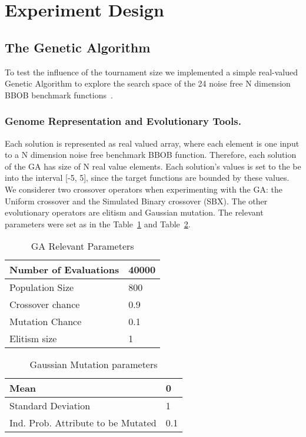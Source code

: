 \section{Experiment Design}

\subsection{The Genetic Algorithm}\label{sec:proposed:ga}

To test the influence of the tournament size we implemented a simple real-valued Genetic Algorithm to explore the search space of the 24 noise free N dimension BBOB benchmark functions~\cite{hansen2010real}.

\subsubsection*{Genome Representation and Evolutionary Tools.}
Each solution is represented as real valued array, where each element is one input to a N dimension noise free benchmark BBOB function. Therefore, each solution of the GA has size of N real value elements. Each solution's values is set to the be into the interval [-5, 5], since the target functions are bounded by these values. We considerer two crossover operators when experimenting with the GA: the Uniform crossover and the Simulated Binary crossover (SBX). The other evolutionary operators are elitism and Gaussian mutation. The relevant parameters were set as in the Table~\ref{relevant_par} and Table~\ref{gaussian_par}.

\vspace{3mm}
\begin{table}[!ht]
	\centering
	\begin{tabular}{|l|l|}
	\hline
	Number of Evaluations & 40000 \\ \hline
	Population Size &  800		\\ \hline
	Crossover chance 	& 0.9	\\ \hline
	Mutation Chance 	& 0.1	\\ \hline		
	Elitism size 		& 1		\\ \hline		
	\end{tabular}
	\caption{GA Relevant Parameters}
	\label{relevant_par}
\end{table}
	\vspace{-2mm}
%
\begin{table}[!ht]
	\centering
	\begin{tabular}{|l|l|}
	\hline
		Mean & 0 \\ \hline		
		Standard Deviation & 1 \\ \hline		
		Ind. Prob. Attribute to be Mutated &  0.1 \\ \hline		
	\end{tabular}
	\caption{Gaussian Mutation parameters}
	\label{gaussian_par}
\end{table}

